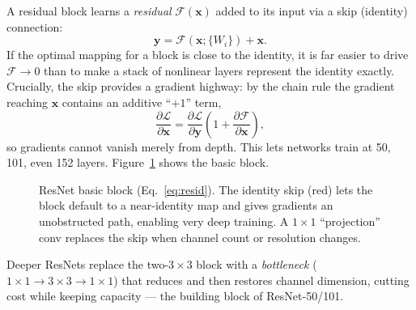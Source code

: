 A residual block learns a \emph{residual} $\mathcal{F}(\mathbf{x})$ added to its
input via a skip (identity) connection:
\begin{equation}
\mathbf{y} = \mathcal{F}(\mathbf{x}; \{W_i\}) + \mathbf{x}.
\label{eq:resid}
\end{equation}
If the optimal mapping for a block is close to the identity, it is far easier to
drive $\mathcal{F}\to 0$ than to make a stack of nonlinear layers represent the
identity exactly. Crucially, the skip provides a gradient highway: by the chain
rule the gradient reaching $\mathbf{x}$ contains an additive ``$+1$'' term,
\begin{equation}
\frac{\partial \mathcal{L}}{\partial \mathbf{x}}
= \frac{\partial \mathcal{L}}{\partial \mathbf{y}}
\left(1 + \frac{\partial \mathcal{F}}{\partial \mathbf{x}}\right),
\end{equation}
so gradients cannot vanish merely from depth. This lets networks train at 50,
101, even 152 layers. Figure~\ref{fig:resblock} shows the basic block.

\begin{figure}[h]
\centering
{}
\caption{ResNet basic block (Eq.~\ref{eq:resid}). The identity skip (red) lets
the block default to a near-identity map and gives gradients an unobstructed
path, enabling very deep training. A $1\times1$ ``projection'' conv replaces the
skip when channel count or resolution changes.}
\label{fig:resblock}
\end{figure}

Deeper ResNets replace the two-$3\times3$ block with a \emph{bottleneck}
($1\times1\to3\times3\to1\times1$) that reduces and then restores channel
dimension, cutting cost while keeping capacity --- the building block of
ResNet-50/101.

